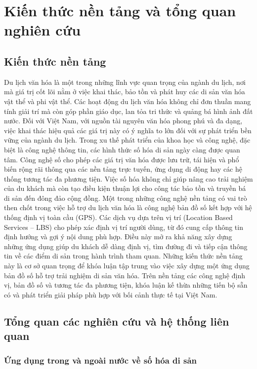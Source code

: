 \chapter{Kiến thức nền tảng và tổng quan nghiên cứu}

\section{Kiến thức nền tảng}
Du lịch văn hóa là một trong những lĩnh vực quan trọng của ngành du lịch, nơi mà giá trị cốt lõi nằm ở việc khai thác, bảo tồn và phát huy các di sản văn hóa vật thể và phi vật thể. Các hoạt động du lịch văn hóa không chỉ đơn thuần mang tính giải trí mà còn góp phần giáo dục, lan tỏa tri thức và quảng bá hình ảnh đất nước. Đối với Việt Nam, với nguồn tài nguyên văn hóa phong phú và đa dạng, việc khai thác hiệu quả các giá trị này có ý nghĩa to lớn đối với sự phát triển bền vững của ngành du lịch.  
Trong xu thế phát triển của khoa học và công nghệ, đặc biệt là công nghệ thông tin, các hình thức số hóa di sản ngày càng được quan tâm. Công nghệ số cho phép các giá trị văn hóa được lưu trữ, tái hiện và phổ biến rộng rãi thông qua các nền tảng trực tuyến, ứng dụng di động hay các hệ thống tương tác đa phương tiện. Việc số hóa không chỉ giúp nâng cao trải nghiệm của du khách mà còn tạo điều kiện thuận lợi cho công tác bảo tồn và truyền bá di sản đến đông đảo cộng đồng.  
Một trong những công nghệ nền tảng có vai trò then chốt trong việc hỗ trợ du lịch văn hóa là công nghệ bản đồ số kết hợp với hệ thống định vị toàn cầu (GPS). Các dịch vụ dựa trên vị trí (Location Based Services – LBS) cho phép xác định vị trí người dùng, từ đó cung cấp thông tin định hướng và gợi ý nội dung phù hợp. Điều này mở ra khả năng xây dựng những ứng dụng giúp du khách dễ dàng định vị, tìm đường đi và tiếp cận thông tin về các điểm di sản trong hành trình tham quan.  
Những kiến thức nền tảng này là cơ sở quan trọng để khóa luận tập trung vào việc xây dựng một ứng dụng bản đồ số hỗ trợ trải nghiệm di sản văn hóa. Trên nền tảng các công nghệ định vị, bản đồ số và tương tác đa phương tiện, khóa luận kế thừa những tiến bộ sẵn có và phát triển giải pháp phù hợp với bối cảnh thực tế tại Việt Nam.  


\section{Tổng quan các nghiên cứu và hệ thống liên quan}
\subsection{Ứng dụng trong và ngoài nước về số hóa di sản}
